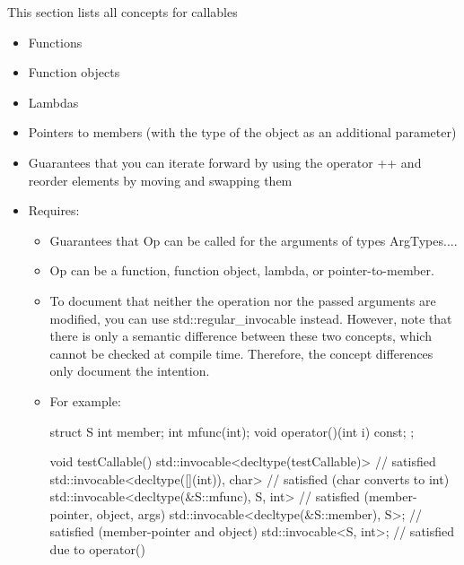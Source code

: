 
This section lists all concepts for callables

\begin{itemize}
\item
Functions

\item
Function objects

\item
Lambdas

\item
Pointers to members (with the type of the object as an additional parameter)
\end{itemize}



\begin{itemize}
\item
Guarantees that you can iterate forward by using the operator ++ and reorder elements by moving and swapping them

\item
Requires:
\begin{itemize}
\item
Guarantees that Op can be called for the arguments of types ArgTypes....

\item
Op can be a function, function object, lambda, or pointer-to-member.

\item
To document that neither the operation nor the passed arguments are modified, you can use std::regular\_invocable instead. However, note that there is only a semantic difference between these two concepts, which cannot be checked at compile time. Therefore, the concept differences only document the intention.

\item
For example:

\begin{cpp}
struct S {
	int member;
	int mfunc(int);
	void operator()(int i) const;
};

void testCallable()
{
	std::invocable<decltype(testCallable)> // satisfied
	std::invocable<decltype([](int){}), char> // satisfied (char converts to int)
	std::invocable<decltype(&S::mfunc), S, int> // satisfied (member-pointer, object, args)
	std::invocable<decltype(&S::member), S>; // satisfied (member-pointer and object)
	std::invocable<S, int>; // satisfied due to operator()
}
\end{cpp}


\end{itemize}
\end{itemize}
